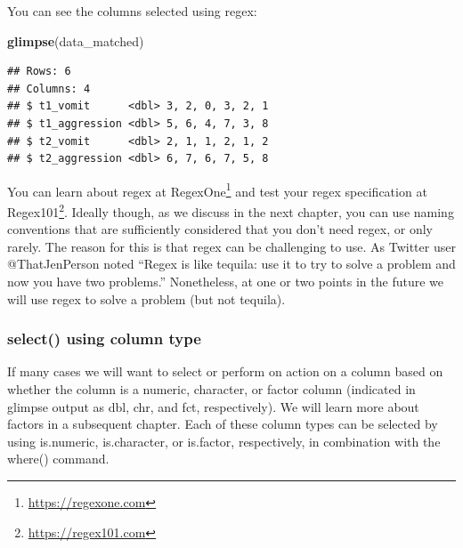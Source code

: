 \documentclass[
]{krantz}
\makeatletter
\newenvironment{Shaded}{\begin{snugshade}}{\end{snugshade}}
\newcommand{\KeywordTok}[1]{\textcolor[rgb]{0.27,0.27,0.27}{\textbf{#1}}}
\newcommand{\NormalTok}[1]{#1}
\newcommand{\OperatorTok}[1]{\textcolor[rgb]{0.43,0.43,0.43}{\textbf{#1}}}
\newcommand{\StringTok}[1]{\textcolor[rgb]{0.5,0.5,0.5}{#1}}
\renewcommand{\href}[2]{#2\footnote{\url{#1}}}
\newenvironment{kframe}{%
\medskip{}
\setlength{\fboxsep}{.8em}
 \def\at@end@of@kframe{}%
 \ifinner\ifhmode%
  \def\at@end@of@kframe{\end{minipage}}%
  \begin{minipage}{\columnwidth}%
 \fi\fi%
 \def\FrameCommand##1{\hskip\@totalleftmargin \hskip-\fboxsep
 \colorbox{shadecolor}{##1}\hskip-\fboxsep
     \hskip-\linewidth \hskip-\@totalleftmargin \hskip\columnwidth}%
 \MakeFramed {\advance\hsize-\width
   \@totalleftmargin\z@ \linewidth\hsize
   \@setminipage}}%
 {\par\unskip\endMakeFramed%
 \at@end@of@kframe}
\renewenvironment{Shaded}{\begin{kframe}}{\end{kframe}}
\makeatother
\begin{document}
\begin{Shaded}
\end{Shaded}

You can see the columns selected using regex:

\begin{Shaded}
\begin{Highlighting}[]
\KeywordTok{glimpse}\NormalTok{(data_matched)}
\end{Highlighting}
\end{Shaded}

\begin{verbatim}
## Rows: 6
## Columns: 4
## $ t1_vomit      <dbl> 3, 2, 0, 3, 2, 1
## $ t1_aggression <dbl> 5, 6, 4, 7, 3, 8
## $ t2_vomit      <dbl> 2, 1, 1, 2, 1, 2
## $ t2_aggression <dbl> 6, 7, 6, 7, 5, 8
\end{verbatim}

You can learn about regex at \href{https://regexone.com}{RegexOne} and test your regex specification at \href{https://regex101.com}{Regex101}. Ideally though, as we discuss in the next chapter, you can use naming conventions that are sufficiently considered that you don't need regex, or only rarely. The reason for this is that regex can be challenging to use. As Twitter user @ThatJenPerson noted ``Regex is like tequila: use it to try to solve a problem and now you have two problems.'' Nonetheless, at one or two points in the future we will use regex to solve a problem (but not tequila).

\hypertarget{select-using-column-type}{%
\subsubsection{select() using column type}\label{select-using-column-type}}

If many cases we will want to select or perform on action on a column based on whether the column is a numeric, character, or factor column (indicated in glimpse output as dbl, chr, and fct, respectively). We will learn more about factors in a subsequent chapter. Each of these column types can be selected by using is.numeric, is.character, or is.factor, respectively, in combination with the where() command.
\end{document}
